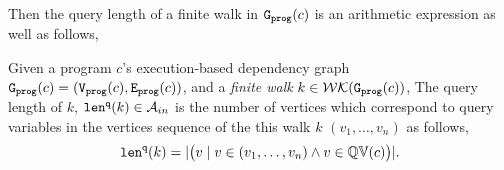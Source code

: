 Then the query length of a finite walk in  $\mathtt{{G_{prog}}}(c)$ is an arithmetic expression as well as follows,
\begin{defn}
  \label{def:qlen}
  Given 
  a program $c$'s execution-based dependency graph 
  $\mathtt{{G_{prog}}}({c}) = (\mathtt{{V_{prog}}}(c), \mathtt{{E_{prog}}}(c))$, 
   and a \emph{finite walk} $k \in \mathcal{WK}(\mathtt{{G_{prog}}}(c))$,
  The query length of $k$, $\mathtt{len}^{\tt q}(k) \in \mathcal{A}_{in}$ 
  is the number of vertices which correspond to query variables in the vertices sequence of the this walk $k$
  $(v_1, \ldots, v_{n})$ as follows, 
  \[
    \mathtt{len}^{\tt q}(k) = |\big( v \mid v \in (v_1, \ldots, v_{n}) \land v \in \mathbb{QV}(c) \big)|.
  \]
  \end{defn}
%
